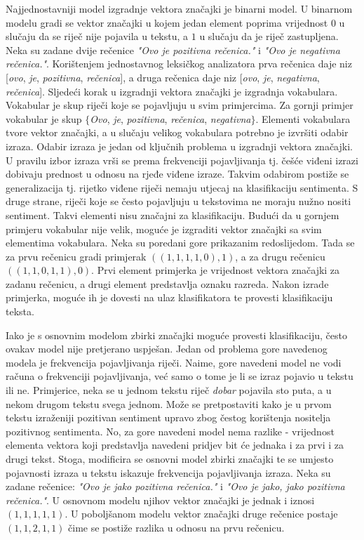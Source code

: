 \documentclass[times, utf8, zavrsni, numeric]{fer}
\begin{document}
\par Najjednostavniji model izgradnje vektora značajki je binarni model.
U binarnom modelu gradi se vektor značajki u kojem jedan element poprima vrijednost $0$ u slučaju 
da se riječ nije pojavila u tekstu, a $1$ u slučaju da je riječ zastupljena.
Neka su zadane dvije rečenice \textit{"Ovo je pozitivna rečenica."} i \textit{"Ovo je negativna rečenica."}.
Korištenjem jednostavnog leksičkog analizatora prva rečenica daje niz [\textit{ovo}, \textit{je}, 
\textit{pozitivna}, \textit{rečenica}], a druga rečenica daje niz [\textit{ovo}, \textit{je}, 
\textit{negativna}, \textit{rečenica}].
Sljedeći korak u izgradnji vektora značajki je izgradnja vokabulara.
Vokabular je skup riječi koje se pojavljuju u svim primjercima. 
Za gornji primjer vokabular je skup $\{$\textit{Ovo}, \textit{je}, \textit{pozitivna}, \textit{rečenica}, 
\textit{negativna}$\}$.
Elementi vokabulara tvore vektor značajki, a u slučaju velikog vokabulara potrebno je izvršiti 
odabir izraza.
Odabir izraza je jedan od ključnih problema u izgradnji vektora značajki.
U pravilu izbor izraza vrši se prema frekvenciji pojavljivanja tj. češće viđeni izrazi dobivaju prednost u 
odnosu na rjeđe viđene izraze.
Takvim odabirom postiže se generalizacija tj. rijetko viđene riječi nemaju utjecaj na klasifikaciju 
sentimenta.
S druge strane, riječi koje se često pojavljuju u tekstovima ne moraju nužno nositi sentiment. 
Takvi elementi nisu značajni za klasifikaciju.
Budući da u gornjem primjeru vokabular nije velik, moguće je izgraditi vektor značajki sa svim elementima
vokabulara. Neka su poredani gore prikazanim redoslijedom.
Tada se za prvu rečenicu gradi primjerak $((1, 1, 1, 1, 0), 1)$, a za drugu rečenicu 
$((1, 1, 0, 1, 1), 0)$.
Prvi element primjerka je vrijednost vektora značajki za zadanu rečenicu, a drugi element predstavlja 
oznaku razreda.
Nakon izrade primjerka, moguće ih je dovesti na ulaz klasifikatora te provesti klasifikaciju teksta.

\par Iako je s osnovnim modelom zbirki značajki moguće provesti klasifikaciju, često ovakav model nije
pretjerano uspješan. 
Jedan od problema gore navedenog modela je frekvencija pojavljivanja riječi.
Naime, gore navedeni model ne vodi računa o frekvenciji pojavljivanja, već samo o tome je li se izraz
pojavio u tekstu ili ne.
Primjerice, neka se u jednom tekstu riječ \textit{dobar} pojavila sto puta, a u nekom drugom tekstu svega
jednom.
Može se pretpostaviti kako je u prvom tekstu izraženiji pozitivan sentiment upravo zbog čestog korištenja
nositelja pozitivnog sentimenta. 
No, za gore navedeni model nema razlike - vrijednost elementa vektora koji predstavlja navedeni pridjev 
bit će jednaka i za prvi i za drugi tekst.
Stoga, modificira se osnovni model zbirki značajki te se umjesto pojavnosti izraza u tekstu iskazuje
frekvencija pojavljivanja izraza. 
Neka su zadane rečenice: \textit{"Ovo je jako pozitivna rečenica."} i \textit{"Ovo je jako, jako pozitivna
rečenica."}. U osnovnom modelu njihov vektor značajki je jednak i iznosi $(1, 1, 1, 1, 1)$.
U poboljšanom modelu vektor značajki druge rečenice postaje $(1, 1, 2, 1, 1)$ čime se postiže razlika 
u odnosu na prvu rečenicu.
\end{document}
